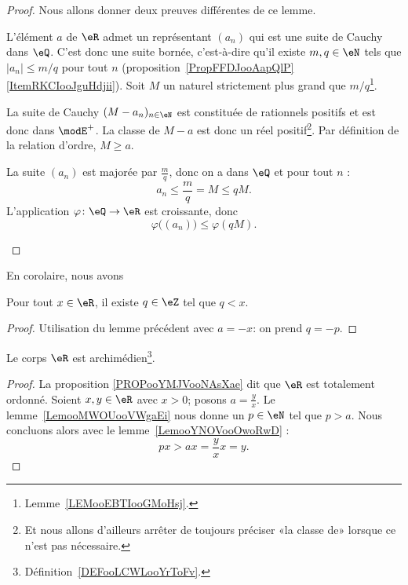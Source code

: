 \begin{proof}
	Nous allons donner deux preuves différentes de ce lemme.
	\begin{subproof}

		L'élément \( a\) de \( \eR\) admet un représentant \( (a_n)\) qui est une suite de Cauchy dans \( \eQ\). C'est donc une suite bornée, c'est-à-dire qu'il existe \( m,q\in \eN\) tels que \( | a_n |\leq m/q\) pour tout \( n\) (proposition~\ref{PropFFDJooAapQlP}\ref{ItemRKCIooJguHdjii}). Soit \( M\) un naturel strictement plus grand que \( m/q\)\footnote{Lemme~\ref{LEMooEBTIooGMoHsj}.}.

		La suite de Cauchy \( (M-a_n)_{n\in \eN}\) est constituée de rationnels positifs et est donc dans \( \modE^+\). La classe de \( M-a\) est donc un réel positif\footnote{Et nous allons d'ailleurs arrêter de toujours préciser «la classe de» lorsque ce n'est pas nécessaire.}. Par définition de la relation d'ordre, \( M\geq a\).

		La suite \( (a_n)\) est majorée par \( \frac{ m }{ q }\), donc on a dans \( \eQ\) et pour tout \( n\) :
		\begin{equation}
			a_n\leq \frac{ m }{ q }=M\leq qM.
		\end{equation}
		L'application \( \varphi\colon \eQ\to \eR\) est croissante, donc
		\begin{equation}
			\varphi\big( (a_n) \big)\leq \varphi(qM).
		\end{equation}
	\end{subproof}
\end{proof}

En corolaire, nous avons
\begin{lemma}      \label{LEMooMWOUooVWgbFi}
	Pour tout \( x\in \eR\), il existe \( q\in \eZ\) tel que \( q < x\).
\end{lemma}
\begin{proof}
	Utilisation du lemme précédent avec \( a = -x \): on prend \( q = -p \).
\end{proof}

\begin{theorem}        \label{ThoooKJTTooCaxEny}
	Le corps \( \eR\) est archimédien\footnote{Définition~\ref{DEFooLCWLooYrToFv}.}.
\end{theorem}

\begin{proof}
	La proposition \ref{PROPooYMJVooNAsXae} dit que \( \eR\) est totalement ordonné. Soient \( x,y\in \eR\) avec \( x>0\); posons \( a=\frac{ y }{ x }\). Le lemme~\ref{LemooMWOUooVWgaEi} nous donne un \( p \in \eN\) tel que \(p > a\). Nous concluons alors avec le lemme~\ref{LemooYNOVooOwoRwD} :
	\begin{equation}
		px>ax=\frac{ y }{ x }x=y.
	\end{equation}
\end{proof}

